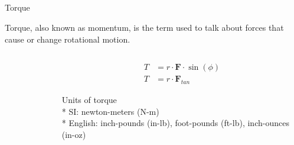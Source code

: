 \subsection{}
{
\begin{frame}{Torque}

Torque, also known as momentum, is the term used 
to talk about forces that cause or change rotational motion.

\begin{columns}
\begin{column}{0.5\textwidth}  %

	\vspace{-3mm}
   	\begin{figure}
 	\end{figure}

\end{column}

\begin{column}{0.5\textwidth}
\vspace{-20mm}
\begin{equation*}
\begin{split}
T & = r \cdot \mathbf{F} \cdot  \sin(\phi)  \\
T & = r \cdot \mathbf{F}_{tan} 
\end{split}
\end{equation*}


Units of torque \\
* SI: newton-meters (N-m) \\
* English: inch-pounds (in-lb), foot-pounds (ft-lb), inch-ounces (in-oz)
 
\end{column}


\end{columns}






\end{frame}
}


